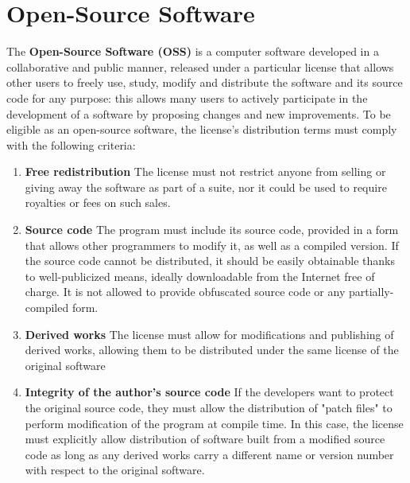 \documentclass[Lau,oneside]{sapthesis}%
\begin{document}
\section{Open-Source Software}
The \textbf{Open-Source Software (OSS)} is a computer software developed in a collaborative and public manner, released under a particular license that allows other users to freely use, study, modify and distribute the software and its source code for any purpose: this allows many users to actively participate in the development of a software by proposing changes and new improvements.
\newline \newline
To be eligible as an open-source software, the license's distribution terms must comply with the following criteria: \cite{ref:osd}
\begin{enumerate}
    
    \item \textbf{Free redistribution} \newline 
    The license must not restrict anyone from selling or giving away the software as part of a suite, nor it could be used to require royalties or fees on such sales.
    
    \item \textbf{Source code} \newline
    The program must include its source code, provided in a form that allows other programmers to modify it, as well as a compiled version. If the source code cannot be distributed, it should be easily obtainable thanks to well-publicized means, ideally downloadable from the Internet free of charge.
    It is not allowed to provide obfuscated source code or any partially-compiled form.
    
    \item \textbf{Derived works} \newline
    The license must allow for modifications and publishing of derived works, allowing them to be distributed under the same license of the original software
    
    \item \textbf{Integrity of the author's source code} \newline
    If the developers want to protect the original source code, they must allow the distribution of "patch files" to perform modification of the program at compile time. In this case, the license must explicitly allow distribution of software built from a modified source code as long as any derived works carry a different name or version number with respect to the original software. 
    

\end{enumerate}
\end{document}
